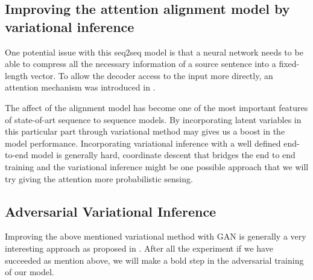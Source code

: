 \documentclass{article}
\begin{document}
\subsection{Improving the attention alignment model by variational inference }

One potential issue with this seq2seq model is that a neural network needs to be able to compress all the necessary information of a source sentence into a fixed-length vector. To allow the decoder access to the input more directly, an attention mechanism was introduced in \cite{attention}.

The affect of the alignment model has become one of the most important features of state-of-art sequence to sequence models. By incorporating latent variables in this particular part through variational method may gives us a boost in the model performance. Incorporating variational inference with a well defined end-to-end model is generally hard, coordinate descent that bridges the end to end training and the variational inference might be one possible approach that we will try giving the attention more probabilistic sensing.

\subsection{Adversarial Variational Inference}
Improving the above mentioned variational method with GAN is generally a very interesting approach as proposed in \cite{aae}. After all the experiment if we have succeeded as mention above, we will make a bold step in the adversarial training of our model.



\end{document}
